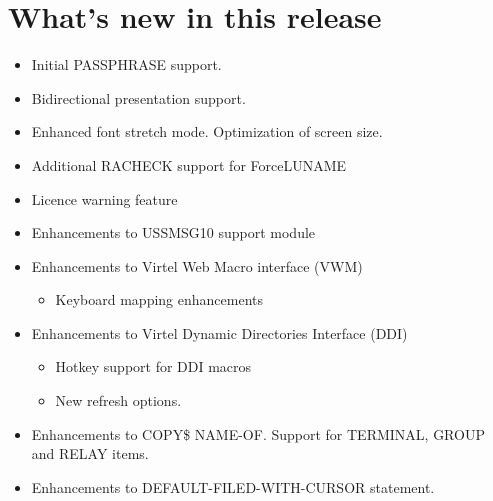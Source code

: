 \documentclass[letterpaper,10pt,english]{sphinxmanual}
\begin{document}
\chapter{What’s new in this release}
\label{\detokenize{Migration_Guide:what-s-new-in-this-release}}\label{\detokenize{Migration_Guide:index-9}}
\begin{itemize}
\item {} 
Initial PASSPHRASE support.

\item {} 
Bidirectional presentation support.

\item {} 
Enhanced font stretch mode. Optimization of screen size.

\item {} 
Additional RACHECK support for ForceLUNAME

\item {} 
Licence warning feature

\item {} 
Enhancements to USSMSG10 support module

\item {} 
Enhancements to Virtel Web Macro interface (VWM)
\begin{itemize}
\item {} 
Keyboard mapping enhancements

\end{itemize}

\item {} 
Enhancements to Virtel Dynamic Directories Interface (DDI)
\begin{itemize}
\item {} 
Hotkey support for DDI macros

\item {} 
New refresh options.

\end{itemize}

\end{itemize}

\begin{itemize}
\item {} 
Enhancements to COPY\$ NAME-OF. Support for TERMINAL, GROUP and RELAY items.

\item {} 
Enhancements to DEFAULT-FILED-WITH-CURSOR statement.

\end{itemize}
\end{document}
